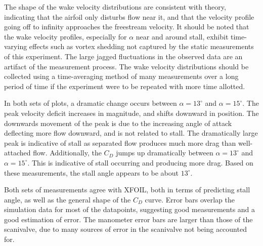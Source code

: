 \documentclass[runningheads]{llncs}
\begin{document}
\noindent
The shape of the wake velocity distributions are consistent with theory, indicating that the airfoil only disturbs flow near it, and that the velocity profile going off to infinity approaches the freestream velocity. It should be noted that the wake velocity profiles, especially for $\alpha$ near and around stall, exhibit time-varying effects such as vortex shedding not captured by the static measurements of this experiment. The large jagged fluctuations in the observed data are an artifact of the measurement process. The wake velocity distributions should be collected using a time-averaging method of many measurements over a long period of time if the experiment were to be repeated with more time allotted.\newline

\noindent
In both sets of plots, a dramatic change occurs between $\alpha = 13^\circ$ and $\alpha = 15 ^\circ$. The peak velocity deficit increases in magnitude, and shifts downward in position. The downwards movement of the peak is due to the increasing angle of attack deflecting more flow downward, and is not related to stall. The dramatically large peak is indicative of stall as separated flow produces much more drag than well-attached flow. Additionally, the $C_D$ jumps up dramatically between $\alpha = 13^\circ$ and $\alpha = 15 ^\circ$. This is indicative of stall occurring and producing more drag. Based on these measurements, the stall angle appears to be about $13^\circ$.\newline

\noindent
Both sets of measurements agree with XFOIL, both in terms of predicting stall angle, as well as the general shape of the $C_D$ curve. Error bars overlap the simulation data for most of the datapoints, suggesting good measurements and a good estimation of error. The manometer error bars are larger than those of the scanivalve, due to many sources of error in the scanivalve not being accounted for.\newline
\end{document}
